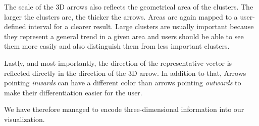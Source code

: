 The scale of the 3D arrows also reflects the geometrical area of the clusters. The larger the clusters are, the thicker the arrows. Areas are again mapped to a user-defined interval for a clearer result. Large clusters are usually important because they represent a general trend in a given area and users should be able to see them more easily and also distinguish them from less important clusters.

Lastly, and most importantly, the direction of the representative vector is reflected directly in the direction of the 3D arrow. In addition to that, Arrows pointing {\it inwards} can have a different color than arrows pointing {\it outwards} to make their differentiation easier for the user.

We have therefore managed to encode three-dimensional information into our visualization.

